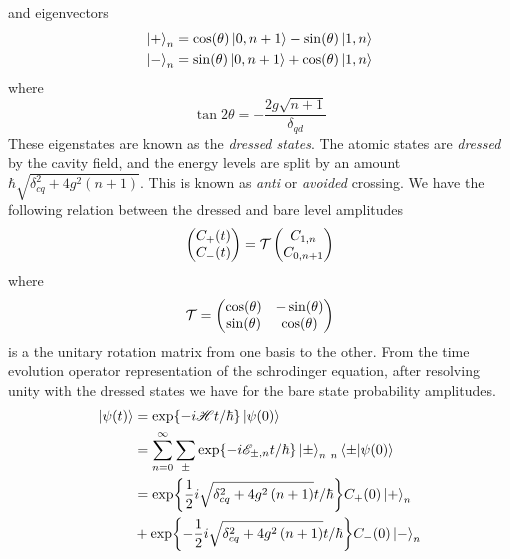 and eigenvectors
\begin{align}
  \ket{+}_n &= \cos(\theta) \ket{0, n+1} - \sin(\theta) \ket{1, n} \\
  \ket{-}_n &= \sin(\theta) \ket{0, n+1} + \cos(\theta) \ket{1, n} 
\end{align}
where
\begin{equation}
  \tan{2\theta} = -\frac{2g\sqrt{n+1}}{\delta_{qd}}
\end{equation}
These eigenstates are known as the \emph{dressed states}.
The atomic states are \emph{dressed} by the cavity field, and the energy levels are split by an amount $\hbar \sqrt{\delta_{cq}^2 + 4g^2\left(n+1\right)}$.
This is known as \emph{anti} or \emph{avoided} crossing.
We have the following relation between the dressed and bare level amplitudes
\begin{equation}
  \begin{pmatrix}
    \mqty{C_+(t) \\ C_-(t)}
  \end{pmatrix}
  =
  \mathcal{T}
  \begin{pmatrix}
    \mqty{C_{1, n} \\ C_{0, n+1}}
  \end{pmatrix}
\end{equation}
where
\begin{equation}
  \mathcal{T} = 
  \begin{pmatrix}
    \mqty{\cos(\theta) & -\sin(\theta) \\ \sin(\theta) & \cos(\theta) }
  \end{pmatrix}
\end{equation}
is a the unitary rotation matrix from one basis to the other.
From the time evolution operator representation of the schrodinger equation, after resolving unity with the dressed states we have for the bare state probability amplitudes. 
\begin{align*}
  \ket{\psi(t)} &= \exp{-i\mathscr{H}t/\hbar} \ket{\psi(0)}\\
                &= \sum_{n=0}^\infty \sum_{\pm} \exp{-i\mathscr{E}_{\pm, n}t/\hbar} \ket{\pm}_{n \ n}\bra{\pm}\ket{\psi(0)}\\
                &= \exp{\frac{1}{2} i \sqrt{\delta_{cq}^2 + 4g^2 \left(n+1\right)} t/\hbar} C_+(0) \ket{+}_n\\
                &+ \exp{-\frac{1}{2} i \sqrt{\delta_{cq}^2 + 4g^2 \left(n+1\right)}t/\hbar} C_-(0) \ket{-}_n
\end{align*}
